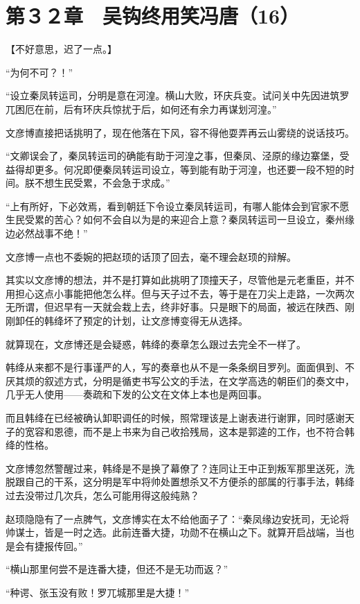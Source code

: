 \section{第３２章　吴钩终用笑冯唐（16）}

【不好意思，迟了一点。】

“为何不可？！”

“设立秦凤转运司，分明是意在河湟。横山大败，环庆兵变。试问关中先因进筑罗兀困厄在前，后有环庆兵惊扰于后，如何还有余力再谋划河湟。”

文彦博直接把话挑明了，现在他落在下风，容不得他耍弄再云山雾绕的说话技巧。

“文卿误会了，秦凤转运司的确能有助于河湟之事，但秦凤、泾原的缘边寨堡，受益得却更多。何况即便秦凤转运司设立，等到能有助于河湟，也还要一段不短的时间。朕不想生民受累，不会急于求成。”

“上有所好，下必效焉，看到朝廷下令设立秦凤转运司，有哪人能体会到官家不愿生民受累的苦心？如何不会自以为是的来迎合上意？秦凤转运司一旦设立，秦州缘边必然战事不绝！”

文彦博一点也不委婉的把赵顼的话顶了回去，毫不理会赵顼的辩解。

其实以文彦博的想法，并不是打算如此挑明了顶撞天子，尽管他是元老重臣，并不用担心这点小事能把他怎么样。但与天子过不去，等于是在刀尖上走路，一次两次无所谓，但迟早有一天就会栽上去，终非好事。只是眼下的局面，被远在陕西、刚刚卸任的韩绛坏了预定的计划，让文彦博变得无从选择。

就算现在，文彦博还是会疑惑，韩绛的奏章怎么跟过去完全不一样了。

韩绛从来都不是行事谨严的人，写的奏章也从不是一条条纲目罗列。面面俱到、不厌其烦的叙述方式，分明是循吏书写公文的手法，在文学高选的朝臣们的奏文中，几乎无人使用——奏疏和下发的公文在文体上本也是两回事。

而且韩绛在已经被确认卸职调任的时候，照常理该是上谢表进行谢罪，同时感谢天子的宽容和恩德，而不是上书来为自己收拾残局，这本是郭逵的工作，也不符合韩绛的性格。

文彦博忽然警醒过来，韩绛是不是换了幕僚了？连同让王中正到叛军那里送死，洗脱跟自己的干系，这分明是军中将帅处置想杀又不方便杀的部属的行事手法，韩绛过去没带过几次兵，怎么可能用得这般纯熟？

赵顼隐隐有了一点脾气，文彦博实在太不给他面子了：“秦凤缘边安抚司，无论将帅谋士，皆是一时之选。此前连番大捷，功勋不在横山之下。就算开启战端，当也是会有捷报传回。”

“横山那里何尝不是连番大捷，但还不是无功而返？”

“种谔、张玉没有败！罗兀城那里是大捷！”


